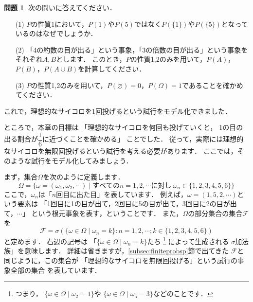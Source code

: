 \documentclass[./main]{subfiles} %
\theoremstyle{definition}
\newtheorem{hamadadefi}{定義}[Section]
\newtheorem{hamadaqst}[hamadadefi]{問題}
\begin{document}
\begin{hamadaqst}\label{checkofP}
次の問いに答えてください．
\begin{itemize}
\item[(1)]$P$の性質1において，$P(1)$や$P(5)$ではなく$P(\{1\})$や$P(\{5\})$となっているのはなぜでしょうか．
\item[(2)]「4の約数の目が出る」という事象，「3の倍数の目が出る」という事象をそれぞれ$A,B$とします．
このとき，$P$の性質1,2のみを用いて，$P(A)$，$P(B)$，$P(A\cup B)$を計算してください．
\item[(3)]$P$の性質1,2のみを用いて，$P(\varnothing)=0$，$P(\Omega)=1$であることを確かめてください．
\end{itemize}
\end{hamadaqst}

これで，理想的なサイコロを1回投げるという試行をモデル化できました．


\label{subsec:infiniteprobsp}

ところで，本章の目標は
「理想的なサイコロを何回も投げていくと，
1の目の出る割合が$\dfrac{1}{6}$に近づくことを確かめる」
ことでした．
従って，実際には理想的なサイコロを無限回投げるという試行を考える必要があります．
ここでは，そのような試行をモデル化してみましょう．

まず，集合$\Omega$を次のように定義します．
\[ \Omega=\{\omega=(\omega_1,\omega_2,\cdots)\mid
すべてのn=1,2,\cdots に対し\ \omega_n\in\{1,2,3,4,5,6\}\} \]
ここで，$\omega_n$は「$n$回目に出た目」を表しています．
例えば，$\omega=(1,5,2,\cdots)$という要素は
「1回目に1の目が出て，2回目に5の目が出て，3回目に2の目が出て，$\cdots$」
という根元事象を表す，ということです．
また，$\Omega$の部分集合の集合$\mathcal{F}$を
\[ \mathcal{F}=\sigma(\{\omega\in\Omega\mid\omega_n=k\}
:n=1,2,\cdots;k\in\{1,2,3,4,5,6\}) \]
と定めます．
右辺の記号は
「$\{\omega\in\Omega\mid\omega_n=k\}$たち
\footnote{つまり，
$\{\omega\in\Omega\mid\omega_2=1\}$や
$\{\omega\in\Omega\mid\omega_5=3\}$などのことです．}
によって生成される
$\sigma$加法族」を意味します．
詳細は省きますが，\ref{subsec:finiteprobsp}節で出てきた
$\mathcal{F}$と同じように，この集合が
「理想的なサイコロを無限回投げる」という試行の事象全部の集合
を表しています．
\end{document}
